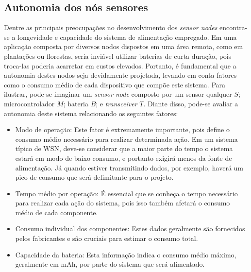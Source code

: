 \documentclass[oneside,openright,12pt]{ufsm_2015} %
\begin{document}
\subsection{Autonomia dos nós sensores}
Dentre as principais preocupações no desenvolvimento dos \textit{sensor nodes} encontra-se a longevidade e capacidade do sistema de alimentação empregado. Em uma aplicação composta por diversos nodos dispostos em uma área remota, como em plantações ou florestas, seria inviável utilizar baterias de curta duração, pois troca-las poderia acarretar em custos elevados. Portanto, é fundamental que a autonomia destes nodos seja devidamente projetada, levando em conta fatores como o consumo médio de cada dispositivo que compõe este sistema. Para ilustrar, pode-se imaginar um \textit{sensor node} composto por um sensor qualquer $S$; microcontrolador $M$; bateria $B$; e \textit{transceiver} $T$. Diante disso, pode-se avaliar a autonomia deste sistema relacionando os seguintes fatores:

\begin{itemize}
    \item Modo de operação: Este fator é extremamente importante, pois define o consumo médio necessário para realizar determinada ação. Em um sistema típico de WSN, deve-se considerar que a maior parte do tempo o sistema estará em modo de baixo consumo, e portanto exigirá menos da fonte de alimentação. Já quando estiver transmitindo dados, por exemplo, haverá um pico de consumo que será delimitante para o projeto.
    
    \item Tempo médio por operação: É essencial que se conheça o tempo necessário para realizar cada ação do sistema, pois isso também afetará o consumo médio de cada componente.
    
    \item Consumo individual dos componentes: Estes dados geralmente são fornecidos pelos fabricantes e são cruciais para estimar o consumo total.
    
    \item Capacidade da bateria: Esta informação indica o consumo médio máximo, geralmente em mAh, por parte do sistema que será alimentado.
\end{itemize}
\end{document}
